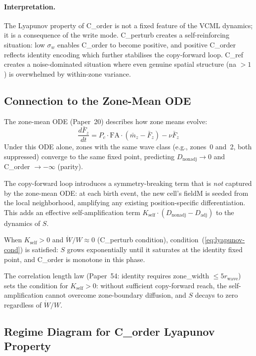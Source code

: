 \documentclass[11pt,a4paper]{article}
\begin{document}
\paragraph{Interpretation.}
The Lyapunov property of C\_order is not a fixed feature of the VCML dynamics;
it is a consequence of the write mode.
C\_perturb creates a self-reinforcing situation: low $\sigma_w$ enables
C\_order to become positive, and positive C\_order reflects identity encoding
which further stabilises the copy-forward loop.
C\_ref creates a noise-dominated situation where even genuine spatial
structure (na $> 1$) is overwhelmed by within-zone variance.

\subsection{Connection to the Zone-Mean ODE}

The zone-mean ODE (Paper~20) describes how zone means evolve:
\begin{equation}
\frac{d\bar{F}_z}{dt} = P_c \cdot \mathrm{FA} \cdot (\bar{m}_z - \bar{F}_z) - \nu \bar{F}_z
\end{equation}
Under this ODE alone, zones with the same wave class (e.g., zones~0 and~2,
both suppressed) converge to the same fixed point, predicting
$D_\mathrm{nonadj} \to 0$ and C\_order $\to -\infty$ (parity).

The copy-forward loop introduces a symmetry-breaking term that is \emph{not}
captured by the zone-mean ODE: at each birth event, the new cell's fieldM is
seeded from the local neighborhood, amplifying any existing position-specific
differentiation.
This adds an effective self-amplification term $K_\mathrm{self} \cdot (D_\mathrm{nonadj} - D_\mathrm{adj})$
to the dynamics of $S$.

When $K_\mathrm{self} > 0$ and $\dot{W}/W \approx 0$ (C\_perturb condition),
condition~(\ref{eq:lyapunov-cond}) is satisfied: $S$ grows exponentially until
it saturates at the identity fixed point, and C\_order is monotone in this phase.

The correlation length law (Paper~54: identity requires zone\_width $\leq 5 r_\mathrm{wave}$)
sets the condition for $K_\mathrm{self} > 0$: without sufficient copy-forward reach,
the self-amplification cannot overcome zone-boundary diffusion, and $S$ decays
to zero regardless of $\dot{W}/W$.

\subsection{Regime Diagram for C\_order Lyapunov Property}
\end{document}
